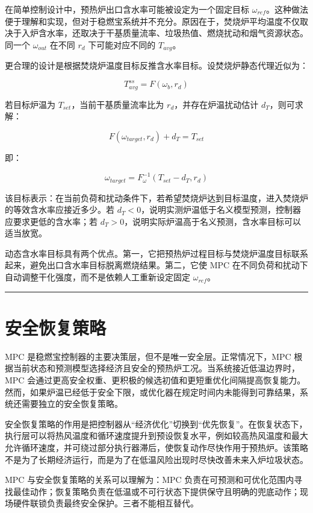 \documentclass[UTF8,openany,zihao=-4,oneside]{ctexbook}
\newcommand{\manualdivider}{\par\vspace{0.6em}\noindent\textcolor{FGLine}{\rule{\linewidth}{0.7pt}}\vspace{0.6em}\par}
\begin{document}
在简单控制设计中，预热炉出口含水率可能被设定为一个固定目标 \(\omega_{ref}\)。这种做法便于理解和实现，但对于稳燃宝系统并不充分。原因在于，焚烧炉平均温度不仅取决于入炉含水率，还取决于干基质量流率、垃圾热值、燃烧扰动和烟气资源状态。同一个 \(\omega_{out}\) 在不同 \(r_d\) 下可能对应不同的 \(T_{avg}\)。

更合理的设计是根据焚烧炉温度目标反推含水率目标。设焚烧炉静态代理近似为：

\[
T_{avg}^{ss}=F\left(\omega_b,r_d\right)
\]

若目标炉温为 \(T_{set}\)，当前干基质量流率比为 \(r_d\)，并存在炉温扰动估计 \(d_T\)，则可求解：

\[
F\left(\omega_{target},r_d\right)+d_T=T_{set}
\]

即：

\[
\omega_{target}=F^{-1}_{\omega}\left(T_{set}-d_T,r_d\right)
\]

该目标表示：在当前负荷和扰动条件下，若希望焚烧炉达到目标温度，进入焚烧炉的等效含水率应接近多少。若 \(d_T<0\)，说明实测炉温低于名义模型预测，控制器应要求更低的含水率；若 \(d_T>0\)，说明实际炉温高于名义预测，含水率目标可以适当放宽。

动态含水率目标具有两个优点。第一，它把预热炉过程目标与焚烧炉温度目标联系起来，避免出口含水率目标脱离燃烧结果。第二，它使 MPC 在不同负荷和扰动下自动调整干化强度，而不是依赖人工重新设定固定 \(\omega_{ref}\)。

\manualdivider

\section{安全恢复策略}\label{sec:mpc-recovery-relation}

MPC 是稳燃宝控制器的主要决策层，但不是唯一安全层。正常情况下，MPC 根据当前状态和预测模型选择经济且安全的预热炉工况。当系统接近低温边界时，MPC 会通过更高安全权重、更积极的候选初值和更短重优化间隔提高恢复能力。然而，如果炉温已经低于安全下限，或优化器在规定时间内未能得到可靠结果，系统还需要独立的安全恢复策略。

安全恢复策略的作用是把控制器从“经济优化”切换到“优先恢复”。在恢复状态下，执行层可以将热风温度和循环速度提升到预设恢复水平，例如较高热风温度和最大允许循环速度，并可绕过部分执行器滞后，使恢复动作尽快作用于预热炉。该策略不是为了长期经济运行，而是为了在低温风险出现时尽快改善未来入炉垃圾状态。

MPC 与安全恢复策略的关系可以理解为：MPC 负责在可预测和可优化范围内寻找最佳动作；恢复策略负责在低温或不可行状态下提供保守且明确的兜底动作；现场硬件联锁负责最终安全保护。三者不能相互替代。
\end{document}
